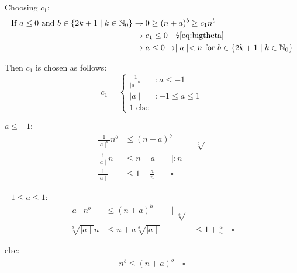 \documentclass[10pt,a4paper,oneside]{report}
\newcommand{\contradict}{\text{\lightning}}
\begin{document}
Choosing $c_{1}$:
\begin{align*}
\text{If }a\leq 0 \text{ and } b\in \lbrace 2k+1\mid k \in \mathbb{N}_{0}\rbrace &\rightarrow 0\geq (n+a)^{b}\geq c_{1}n^{b} \\
&\rightarrow c_{1} \leq 0 \quad\contradict \ref{eq:bigtheta}\\
&\rightarrow a\leq 0 \rightarrow \mid a\mid < n \text{ for } b\in \lbrace 2k+1\mid k \in \mathbb{N}_{0}\rbrace\\
\end{align*}

Then $c_{1}$ is chosen as follows:
\[c_{1} =
  \begin{cases}
    \frac{1}{\mid a\mid^{b}}	& : a \leq -1		\\
    \mid a\mid 				& : -1\le a \le 1	\\
    1 \text{ else}
  \end{cases}
\]

$a\leq -1$:
\begin{align*}
\frac{1}{\mid a\mid^{b}} n^{b} 	&\leq (n-a)^{b} \qquad\mid\sqrt[b]{ }	\\
\frac{1}{\mid a\mid} n 			&\leq n-a					\qquad\mid :n		\\
\frac{1}{\mid a\mid} 			&\leq 1-\frac{a}{n} \qquad\square
\end{align*}

$-1\le a \le 1$:
\begin{align*}
\mid a\mid n^{b}		&\leq (n+a)^{b}	\qquad\mid\sqrt[b]{ }	\\
\sqrt[b]{\mid a \mid}n 	&\leq n+a
\sqrt[b]{\mid a \mid}	&\leq 1+\frac{a}{n}\quad\square
\end{align*}

else:
\begin{align*}
n^{b}\leq (n+a)^{b} \quad\square
\end{align*}
\end{document}
